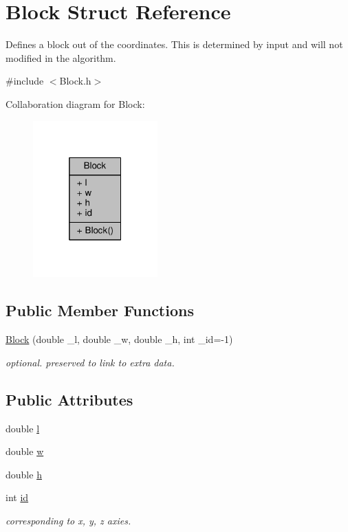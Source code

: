 \hypertarget{structBlock}{}\section{Block Struct Reference}
\label{structBlock}


Defines a block out of the coordinates. This is determined by input and will not modified in the algorithm.  




{\ttfamily \#include $<$Block.\+h$>$}



Collaboration diagram for Block\+:
\nopagebreak
\begin{figure}[H]
\begin{center}
\leavevmode
\includegraphics[width=136pt]{structBlock__coll__graph}
\end{center}
\end{figure}
\subsection*{Public Member Functions}
\begin{DoxyCompactItemize}
\item 
\hyperlink{structBlock_a832b4a589a691d3e10cfecc32398ddd0}{Block} (double \+\_\+l, double \+\_\+w, double \+\_\+h, int \+\_\+id=-\/1)
\begin{DoxyCompactList}\small\item\em optional. preserved to link to extra data. \end{DoxyCompactList}\end{DoxyCompactItemize}
\subsection*{Public Attributes}
\begin{DoxyCompactItemize}
\item 
double \hyperlink{structBlock_aad415a5d98d3645561306bf7d5bb22bb}{l}
\item 
double \hyperlink{structBlock_ae072df7850e56bf12d0234773e7eaa46}{w}
\item 
double \hyperlink{structBlock_a27826799e87ce49b8b1b72e7e2384583}{h}
\item 
int \hyperlink{structBlock_a86f38c868a8dab090101db6492078071}{id}
\begin{DoxyCompactList}\small\item\em corresponding to x, y, z axies. \end{DoxyCompactList}\end{DoxyCompactItemize}


